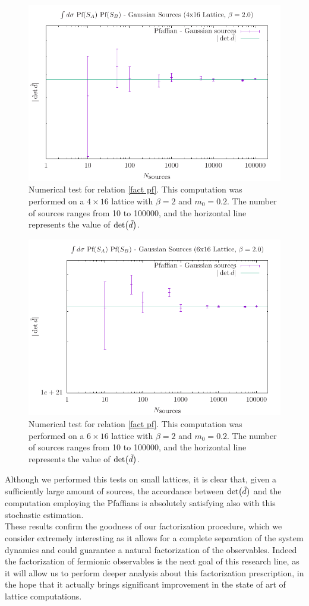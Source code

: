 \begin{figure}
    \centering
    \includegraphics[width=0.8\linewidth]{images/pfaffian4x16.pdf}
    \caption{Numerical test for relation \eqref{fact pf}. This computation was performed on a $4 \times 16$ lattice with $\beta = 2$ and $m_0 = 0.2$.
    The number of sources ranges from 10 to 100000, and the horizontal line represents the value of $\det(\Tilde{d})$.}
    \label{fig: pfaf 4x16}
\end{figure}
\begin{figure}
    \centering
    \includegraphics[width=0.8\linewidth]{images/pfaffian6x16.pdf}
    \caption{Numerical test for relation \eqref{fact pf}. This computation was performed on a $6 \times 16$ lattice with $\beta = 2$ and $m_0 = 0.2$.
    The number of sources ranges from 10 to 100000, and the horizontal line represents the value of $\det(\Tilde{d})$.}
    \label{fig: pfaf 6x16}
\end{figure}
Although we performed this tests on small lattices, it is clear that, given a sufficiently large amount of sources, the accordance between $\det(\Tilde{d})$ and the computation employing the Pfaffians is absolutely satisfying also with this stochastic estimation.
\\ These results confirm the goodness of our factorization procedure, which we consider extremely interesting as it allows for a complete separation of the system dynamics and could guarantee a natural factorization of the observables. Indeed the factorization of fermionic observables is the next goal of this research line, as it will allow us to perform deeper analysis about this factorization prescription, in the hope that it actually brings significant improvement in the state of art of lattice computations.